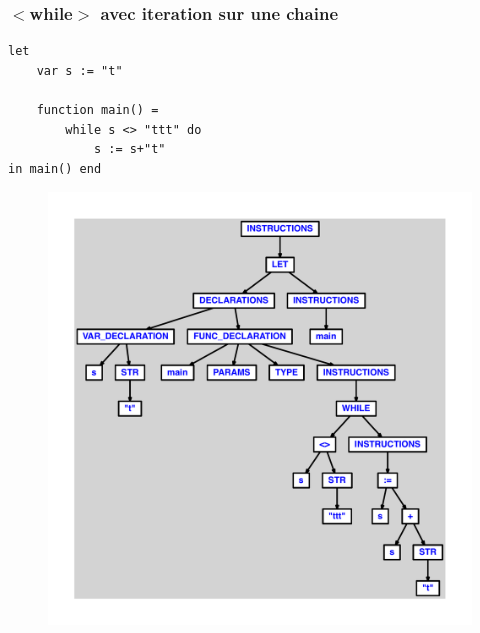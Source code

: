 \documentclass{article}
\begin{document}
\subsubsection{$ < $while$ > $ avec iteration sur une chaine}
\begin{lstlisting}
let
	var s := "t"

	function main() =
		while s <> "ttt" do
			s := s+"t"
in main() end
\end{lstlisting}
\newpage
\begin{figure}[H]
\centering
\includegraphics[max width=\textwidth]{ast/ast_340.pdf}
\end{figure}
\newpage
\end{document}
